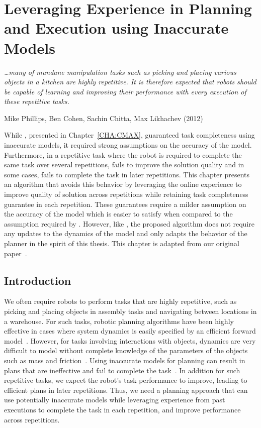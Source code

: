 \chapter{Leveraging Experience in Planning and Execution
  using Inaccurate Models}
\label{CHA:CMAXPP}

\epigraph{\textit{\ldots many of mundane manipulation tasks
such as picking and placing various objects in a kitchen are
highly repetitive. It is therefore expected that robots should
be capable of learning and improving their performance with
every execution of these repetitive tasks.}}{Mike Phillips, Ben Cohen,
Sachin Chitta, Max Likhachev (2012)}

While \cmax{}, presented in Chapter~\ref{CHA:CMAX}, guaranteed
task completeness using inaccurate models, it required strong
assumptions on the accuracy of the model. Furthermore, in a repetitive
task where the robot is required to complete the same task over
several repetitions, \cmax{} fails to improve the solution quality and
in some cases, fails to complete the task in later repetitions. This
chapter presents an algorithm that avoids this behavior by leveraging
the online experience to improve quality of solution across
repetitions while retaining task completeness guarantee in each
repetition. These guarantees require a milder assumption on the
accuracy of the model which is easier to satisfy when compared to the
assumption required by \cmax{}. However, like \cmax{}, the proposed
algorithm does not require any updates to the dynamics of the model
and only adapts the behavior of the planner in the spirit of this thesis. This
chapter is adapted from our original paper~\cite{cmaxpp}.

\section{Introduction}
\label{sec:introduction}

We often require robots to perform tasks that are highly repetitive,
such as picking and placing objects in assembly tasks and navigating
between locations in a warehouse. For such tasks,
robotic planning algorithms have been highly effective in cases where
system dynamics is easily specified by an efficient forward
model~\cite{DBLP:conf/icra/BerensonAG12}. However, for
tasks involving interactions with objects, dynamics are very
difficult to model without
complete knowledge of the parameters of the
objects such as mass and friction~\cite{DBLP:journals/ijrr/JiX01}. 
Using
inaccurate models for planning can result in plans
that are ineffective and fail to complete the
task~\cite{DBLP:journals/ral/McConachiePMB20}. 
In addition for such
repetitive tasks, we expect the robot's task performance to
improve, leading to efficient plans in later repetitions.
Thus, we need
a planning approach that can use potentially inaccurate models while leveraging
experience from
past executions to complete the task in each repetition, and improve
performance across repetitions.


